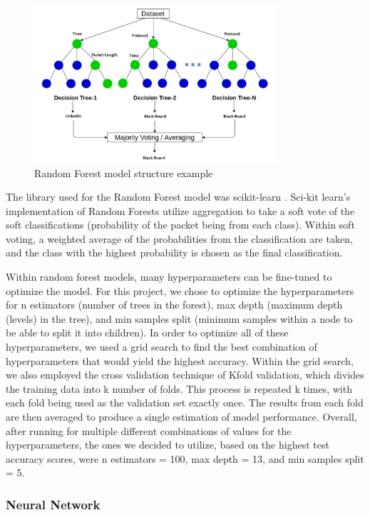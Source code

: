 \documentclass[10pt,sigconf,letterpaper,nonacm]{acmart}
\begin{document}
\begin{figure}[!h]
  \centering
  \includegraphics[width=9cm]{Figures_and_Graphs/RandomForestExample.png}
  \caption{Random Forest model structure example}
  \label{fig:RFExample}
\end{figure}

The library used for the Random Forest model was scikit-learn \cite{scikit-learn}. Sci-kit learn's implementation of Random Forests utilize aggregation to take a soft vote of the soft classifications (probability of the packet being from each class). Within soft voting, a weighted average of the probabilities from the classification are taken, and the class with the highest probability is chosen as the final classification.

Within random forest models, many hyperparameters can be fine-tuned to optimize the model. For this project, we chose to optimize the hyperparameters for n estimators (number of trees in the forest), 
max depth (maximum depth (levels) in the tree), and min samples split (minimum samples within a node to be able to split it into children). In order to optimize all of these hyperparameters, we used a grid search to find the best combination of hyperparameters that would 
yield the highest accuracy. Within the grid search, we also employed the cross validation technique of Kfold validation, which divides the training data into k number of folds. This process is repeated k times, with each fold being used as the validation set exactly once. The results from each fold are then averaged to produce a single estimation of model performance. Overall, after running for multiple different combinations of values for the 
hyperparameters, the ones we decided to utilize, based on the highest test accuracy scores, were n estimators = 100, max depth = 13, and min samples split = 5. 

\subsubsection{Neural Network}
\end{document}
